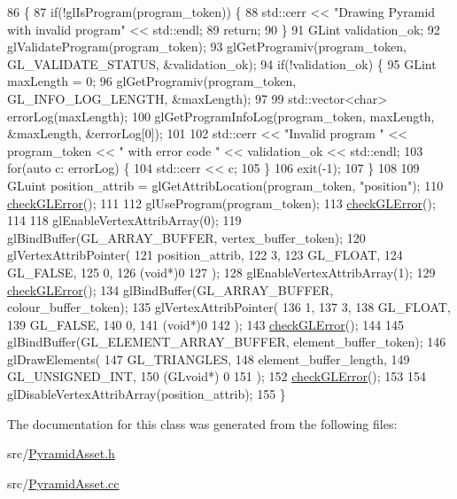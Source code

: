 \begin{DoxyCode}
86                                             \{
87   \textcolor{keywordflow}{if}(!glIsProgram(program\_token)) \{
88     std::cerr << \textcolor{stringliteral}{"Drawing Pyramid with invalid program"} << std::endl;
89     \textcolor{keywordflow}{return};
90   \}
91   GLint validation\_ok;
92   glValidateProgram(program\_token);
93   glGetProgramiv(program\_token, GL\_VALIDATE\_STATUS, &validation\_ok);
94   \textcolor{keywordflow}{if}(!validation\_ok) \{
95     GLint maxLength = 0;
96     glGetProgramiv(program\_token, GL\_INFO\_LOG\_LENGTH, &maxLength);
97 
99     std::vector<char> errorLog(maxLength);
100     glGetProgramInfoLog(program\_token, maxLength, &maxLength, &errorLog[0]);
101 
102     std::cerr << \textcolor{stringliteral}{"Invalid program "} << program\_token << \textcolor{stringliteral}{" with error code "} << validation\_ok << std::endl;
103     \textcolor{keywordflow}{for}(\textcolor{keyword}{auto} c: errorLog) \{
104       std::cerr << c;
105     \}
106     exit(-1);
107   \}
108 
109   GLuint position\_attrib = glGetAttribLocation(program\_token, \textcolor{stringliteral}{"position"});
110   \hyperlink{PyramidAsset_8cc_a75f201b0e53e68726854997957322b8d}{checkGLError}();
111 
112   glUseProgram(program\_token);
113   \hyperlink{PyramidAsset_8cc_a75f201b0e53e68726854997957322b8d}{checkGLError}();
114 
118   glEnableVertexAttribArray(0);
119   glBindBuffer(GL\_ARRAY\_BUFFER, vertex\_buffer\_token);
120   glVertexAttribPointer(
121     position\_attrib,        
122     3,        
123     GL\_FLOAT,   
124     GL\_FALSE,   
125     0,        
126     (\textcolor{keywordtype}{void}*)0    
127   );
128   glEnableVertexAttribArray(1);
129   \hyperlink{PyramidAsset_8cc_a75f201b0e53e68726854997957322b8d}{checkGLError}();
134   glBindBuffer(GL\_ARRAY\_BUFFER, colour\_buffer\_token);
135   glVertexAttribPointer(
136     1,        
137     3,        
138     GL\_FLOAT,   
139     GL\_FALSE,   
140     0,        
141     (\textcolor{keywordtype}{void}*)0    
142   );
143   \hyperlink{PyramidAsset_8cc_a75f201b0e53e68726854997957322b8d}{checkGLError}();
144 
145   glBindBuffer(GL\_ELEMENT\_ARRAY\_BUFFER, element\_buffer\_token);
146   glDrawElements(
147     GL\_TRIANGLES,
148     element\_buffer\_length,
149     GL\_UNSIGNED\_INT,
150     (GLvoid*) 0
151   );
152   \hyperlink{PyramidAsset_8cc_a75f201b0e53e68726854997957322b8d}{checkGLError}();
153 
154   glDisableVertexAttribArray(position\_attrib);
155 \}
\end{DoxyCode}


The documentation for this class was generated from the following files\+:\begin{DoxyCompactItemize}
\item 
src/\hyperlink{PyramidAsset_8h}{Pyramid\+Asset.\+h}\item 
src/\hyperlink{PyramidAsset_8cc}{Pyramid\+Asset.\+cc}\end{DoxyCompactItemize}

